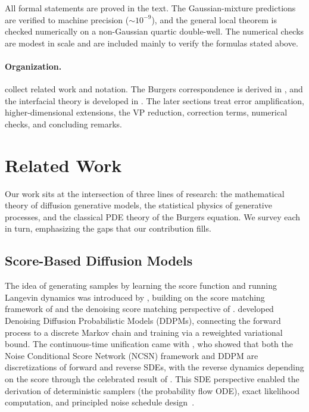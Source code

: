 \documentclass[11pt]{article}
\begin{document}
All formal statements are proved in the text.
The Gaussian-mixture predictions are verified to machine precision (${\sim}10^{-9}$), and the general local theorem is checked numerically on a non-Gaussian quartic double-well.
The numerical checks are modest in scale and are included mainly to verify the formulas stated above.

\paragraph{Organization.}
 collect related work and notation. The Burgers correspondence is derived in , and the interfacial theory is developed in . The later sections treat error amplification, higher-dimensional extensions, the VP reduction, correction terms, numerical checks, and concluding remarks.


\section{Related Work}\label{sec:related}

Our work sits at the intersection of three lines of research: the mathematical theory of diffusion generative models, the statistical physics of generative processes, and the classical PDE theory of the Burgers equation.
We survey each in turn, emphasizing the gaps that our contribution fills.

\subsection{Score-Based Diffusion Models}

The idea of generating samples by learning the score function and running Langevin dynamics was introduced by \citet{song2019generative}, building on the score matching framework of \citet{hyvarinen2005estimation} and the denoising score matching perspective of \citet{vincent2011connection}.
\citet{ho2020denoising} developed Denoising Diffusion Probabilistic Models (DDPMs), connecting the forward process to a discrete Markov chain and training via a reweighted variational bound.
The continuous-time unification came with \citet{song2021score}, who showed that both the Noise Conditional Score Network (NCSN) framework and DDPM are discretizations of forward and reverse SDEs, with the reverse dynamics depending on the score through the celebrated result of \citet{anderson1982reverse}.
This SDE perspective enabled the derivation of deterministic samplers (the probability flow ODE), exact likelihood computation, and principled noise schedule design~\citep{song2021ddim, kingma2021variational, karras2022elucidating}.
\end{document}
